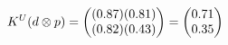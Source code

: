 \documentclass[preview]{standalone}
\begin{document}
\begin{align*}
\special{dvisvgm:raw <g id='unique000'>}K^U(d \otimes p) = \begin{pmatrix} (0.87)(0.81) \\ (0.82)(0.43) \end{pmatrix} = \begin{pmatrix} 0.71 \\ 0.35 \end{pmatrix}\special{dvisvgm:raw </g>}
\end{align*}
\end{document}
